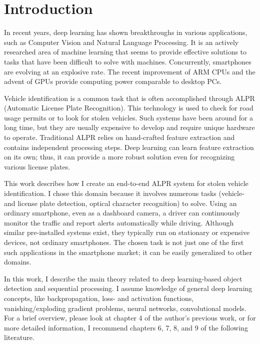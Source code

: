 \chapter{Introduction}

In recent years, deep learning has shown breakthroughs in various applications, such as Computer Vision and Natural Language Processing. It is an actively researched area of machine learning that seems to provide effective solutions to tasks that have been difficult to solve with machines. Concurrently, smartphones are evolving at an explosive rate. The recent improvement of ARM CPUs and the advent of GPUs provide computing power comparable to desktop PCs.

Vehicle identification is a common task that is often accomplished through ALPR (Automatic License Plate Recognition). This technology is used to check for road usage permits or to look for stolen vehicles. Such systems have been around for a long time, but they are usually expensive to develop and require unique hardware to operate. Traditional ALPR relies on hand-crafted feature extraction and contains independent processing steps. Deep learning can learn feature extraction on its own; thus, it can provide a more robust solution even for recognizing various license plates.

This work describes how I create an end-to-end ALPR system for stolen vehicle identification. I chose this domain because it involves numerous tasks (vehicle- and license plate detection, optical character recognition) to solve. Using an ordinary smartphone, even as a dashboard camera, a driver can continuously monitor the traffic and report alerts automatically while driving. Although similar pre-installed systems exist, they typically run on stationary or expensive devices, not ordinary smartphones. The chosen task is not just one of the first such applications in the smartphone market; it can be easily generalized to other domains.

In this work, I describe the main theory related to deep learning-based object detection and sequential processing. I assume knowledge of general deep learning concepts, like backpropagation, loss- and activation functions, vanishing/exploding gradient problems, neural networks, convolutional models. For a brief overview, please look at chapter 4 of the author's previous work\cite{BScThesis}, or for more detailed information, I recommend chapters 6, 7, 8, and 9 of the following literature\cite{DeepLearningBook}.


